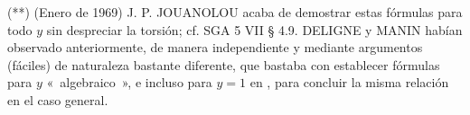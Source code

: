 \medskip

\noindent(**) (Enero de 1969) J. P. JOUANOLOU acaba de demostrar estas
fórmulas para todo $y$ sin despreciar la torsión; cf. SGA 5 VII \S{} 4.9.
DELIGNE y MANIN  habían observado anteriormente, de manera independiente y %
mediante argumentos (fáciles) de naturaleza bastante diferente, que bastaba
con establecer fórmulas para $y$ «~algebraico~», e incluso para $y=1$ en ,
para concluir la misma relación en el caso general.



\providecommand{\Qcoh}{\operatorname{Qcoh}}
\providecommand{\Coh}{\operatorname{Coh}}
\providecommand{\Parf}{\operatorname{Parf}}
\providecommand{\Lib}{\operatorname{Lib}}
\providecommand{\Loclib}{\operatorname{Loclib}}
\providecommand{\Proj}{\operatorname{Proj}}
\providecommand{\Mod}{\operatorname{Mod}}
\providecommand{\Ob}{\operatorname{Ob}}
\providecommand{\Hom}{\operatorname{Hom}}
\providecommand{\toramp}{\operatorname{tor.amp}}
\providecommand{\parfamp}{\operatorname{par.amp}}
\providecommand{\coh}{\operatorname{coh}}
\providecommand{\qcoh}{\operatorname{qcoh}}
\providecommand{\parf}{\operatorname{parf}}
\providecommand{\torf}{\operatorname{torf}}
\providecommand{\amp}{\operatorname{amp}}
\providecommand{\num}{\operatorname{num}}
\providecommand{\naif}{\operatorname{naif}}
\providecommand{\alg}{\operatorname{alg}}
\providecommand{\Pic}{\operatorname{Pic}}
\providecommand{\Gr}{\operatorname{Gr}}
\providecommand{\Fil}{\operatorname{Fil}}
\providecommand{\Ch}{\operatorname{Ch}}
\providecommand{\Todd}{\operatorname{Todd}}
\providecommand{\Diff}{\operatorname{Diff}}
\providecommand{\Dcat}{\mathrm D}
\providecommand{\Tr}{\operatorname{Tr}}
\providecommand{\Z}{\mathbb Z}
\providecommand{\Q}{\mathbb Q}

\newpage
